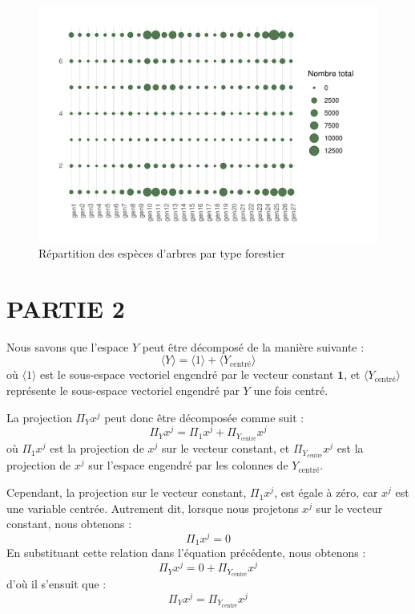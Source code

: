 \documentclass[
]{article}
\begin{document}
\begin{figure}[ht!]

{\centering \includegraphics{EL_MAZZOUJI_Wahel_GILLET_Louison_ADM_DM1_files/figure-latex/especes_forest-1} 

}

\caption{Répartition des espèces d'arbres par type forestier}\label{fig:especes_forest}
\end{figure}

\newpage

\hypertarget{partie-2}{%
\section{PARTIE 2}\label{partie-2}}

Nous savons que l'espace \(Y\) peut être décomposé de la manière
suivante : \[
\langle Y \rangle = \langle 1 \rangle + \langle Y_{\text{centré}} \rangle
\] où \(\langle 1 \rangle\) est le sous-espace vectoriel engendré par le
vecteur constant \(\mathbf{1}\), et
\(\langle Y_{\text{centré}} \rangle\) représente le sous-espace
vectoriel engendré par \(Y\) une fois centré.

La projection \(\Pi_Y x^j\) peut donc être décomposée comme suit : \[
\Pi_Y x^j = \Pi_1 x^j + \Pi_{Y_{\text{centré}}} x^j
\] où \(\Pi_1 x^j\) est la projection de \(x^j\) sur le vecteur
constant, et \(\Pi_{Y_{\text{centré}}} x^j\) est la projection de
\(x^j\) sur l'espace engendré par les colonnes de \(Y_{\text{centré}}\).

Cependant, la projection sur le vecteur constant, \(\Pi_1 x^j\), est
égale à zéro, car \(x^j\) est une variable centrée. Autrement dit,
lorsque nous projetons \(x^j\) sur le vecteur constant, nous obtenons :
\[
\Pi_1 x^j = 0
\] En substituant cette relation dans l'équation précédente, nous
obtenons : \[
\Pi_Y x^j = 0 + \Pi_{Y_{\text{centré}}} x^j
\] d'où il s'ensuit que : \[
\Pi_Y x^j = \Pi_{Y_{\text{centré}}} x^j
\]
\end{document}
